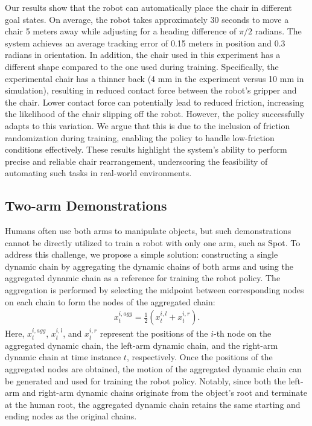 Our results show that the robot can automatically place the chair in different goal states. On average, the robot takes approximately 30 seconds to move a chair 5 meters away while adjusting for a heading difference of $\pi/2$ radians. The system achieves an average tracking error of 0.15 meters in position and 0.3 radians in orientation. In addition, the chair used in this experiment has a different shape compared to the one used during training. Specifically, the experimental chair has a thinner back (4 mm in the experiment versus 10 mm in simulation), resulting in reduced contact force between the robot's gripper and the chair. Lower contact force can potentially lead to reduced friction, increasing the likelihood of the chair slipping off the robot. However, the policy successfully adapts to this variation. We argue that this is due to the inclusion of friction randomization during training, enabling the policy to handle low-friction conditions effectively. These results highlight the system’s ability to perform precise and reliable chair rearrangement, underscoring the feasibility of automating such tasks in real-world environments.




\subsection{Two-arm Demonstrations}
\label{sec:2-arms}
Humans often use both arms to manipulate objects, but such demonstrations cannot be directly utilized to train a robot with only one arm, such as Spot. To address this challenge, we propose a simple solution: constructing a single dynamic chain by aggregating the dynamic chains of both arms and using the aggregated dynamic chain as a reference for training the robot policy. The aggregation is performed by selecting the midpoint between corresponding nodes on each chain to form the nodes of the aggregated chain:
\begin{align}
\label{eqn:two_arms}
   x^{i,agg}_t = \frac{1}{2}(x^{i,l}_t + x^{i,r}_t).
\end{align}
Here, $x^{i,agg}_t$, $x^{i,l}_t$, and $x^{i,r}_t$ represent the positions of the $i$-th node on the aggregated dynamic chain, the left-arm dynamic chain, and the right-arm dynamic chain at time instance $t$, respectively. Once the positions of the aggregated nodes are obtained, the motion of the aggregated dynamic chain can be generated and used for training the robot policy. Notably, since both the left-arm and right-arm dynamic chains originate from the object's root and terminate at the human root, the aggregated dynamic chain retains the same starting and ending nodes as the original chains.



